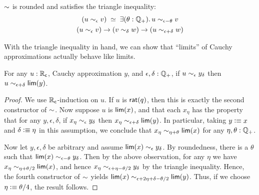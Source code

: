 \begin{cor}
  $\mathord\sim$ is rounded and satisfies the triangle inequality:
    \begin{gather}
      \eqvspaced{
        (u \close\epsilon v)
      }{
        \exis{\theta : \Qp} u \close{\epsilon - \theta} v
      }\\
      (u\close\epsilon v) \to (v\close\delta w) \to (u\close{\epsilon+\delta} w)\label{item:RC-sim-triangle}
    \end{gather}
\end{cor}

With the triangle inequality in hand, we can show that ``limits'' of Cauchy approximations actually behave like limits.

\begin{lem}\label{thm:RC-sim-lim}
  For any $u:\mathbb{R}_\mathsf{c}$, Cauchy approximation $y$, and $\epsilon,\delta:\mathbb{Q}_{+}$, if $u\sim_{\epsilon} y_\delta$ then $u\sim_{\epsilon+\delta} \mathsf{lim}(y)$.
\end{lem}
\begin{proof}
  We use $\mathbb{R}_\mathsf{c}$-induction on $u$.
  If $u$ is $\mathsf{rat}(q)$, then this is exactly the second constructor of $\mathord\sim$.
  Now suppose $u$ is $\mathsf{lim}(x)$, and that each $x_\eta$ has the property that for any $y,\epsilon,\delta$, if $x_\eta\sim_{\epsilon} y_\delta$ then $x_\eta \sim_{\epsilon+\delta} \mathsf{lim}(y)$.
  In particular, taking $y\vcentcolon\equiv x$ and $\delta\vcentcolon\equiv\eta$ in this assumption, we conclude that $x_\eta \sim_{\eta+\theta} \mathsf{lim}(x)$ for any $\eta,\theta:\mathbb{Q}_{+}$.

  Now let $y,\epsilon,\delta$ be arbitrary and assume $\mathsf{lim}(x) \sim_{\epsilon} y_\delta$.
  By roundedness, there is a $\theta$ such that $\mathsf{lim}(x) \sim_{\epsilon-\theta} y_\delta$.
  Then by the above observation, for any $\eta$ we have $x_\eta \sim_{\eta+\theta/2} \mathsf{lim}(x)$, and hence $x_\eta \sim_{\epsilon+\eta-\theta/2} y_\delta$ by the triangle inequality.
  Hence, the fourth constructor of $\mathord\sim$ yields $\mathsf{lim}(x) \sim_{\epsilon+2\eta+\delta-\theta/2} \mathsf{lim}(y)$.
  Thus, if we choose $\eta \vcentcolon\equiv \theta/4$, the result follows.
\end{proof}

